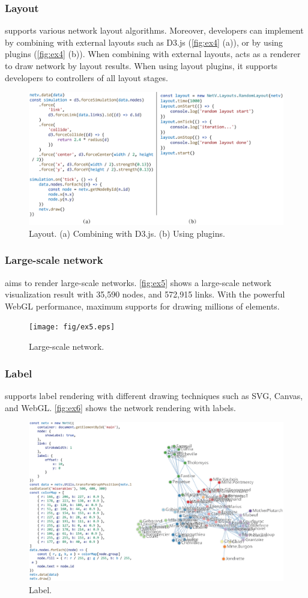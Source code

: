 \subsubsection{Layout}
\name supports various network layout algorithms. Moreover, developers can implement by combining with external layouts such as D3.js (\autoref{fig:ex4} (a)), or by using \name plugins (\autoref{fig:ex4} (b)). When combining with external layouts, \name acts as a renderer to draw network by layout results.
When using \name layout plugins, it supports developers to controllers of all layout stages.
\begin{figure}[htbp]
    \includegraphics[width=\linewidth]{fig/ex4.eps}
    \caption{
        Layout. (a) Combining with D3.js. (b) Using \name plugins.
    }
    \label{fig:ex4}
\end{figure}

\subsubsection{Large-scale network}
\name aims to render large-scale networks. \autoref{fig:ex5} shows a large-scale network visualization result with 35,590 nodes, and 572,915 links. With the powerful WebGL performance, \name maximum supports for drawing millions of elements.

\begin{figure}[htbp]
    \texttt{[image: fig/ex5.eps]}
    \caption{
        Large-scale network.
    }
    \label{fig:ex5}
\end{figure}

\subsubsection{Label}
\name supports label rendering with different drawing techniques such as SVG, Canvas, and WebGL. \autoref{fig:ex6} shows the network rendering with labels.

\begin{figure}[htbp]
    \includegraphics[width=\linewidth]{fig/ex6.eps}
    \caption{
        Label.
    }
    \label{fig:ex6}
\end{figure}